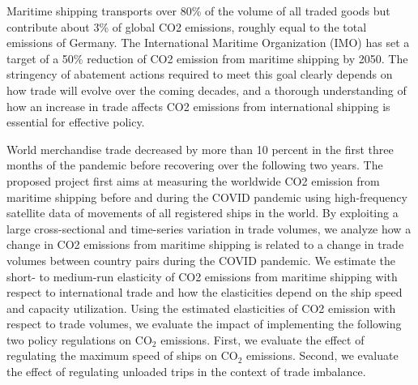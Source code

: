 \documentclass[hidelinks, 12pt,letterpaper]{article}
\begin{document}

 
 
Maritime shipping transports over 80\% of the volume of all traded goods but contribute about 3\% of global CO2 emissions, roughly equal to the total emissions of Germany.  The International Maritime Organization (IMO) has set a target of a 50\% reduction of CO2 emission from maritime shipping by 2050. The stringency of abatement actions required to meet this goal clearly depends on how trade will evolve over the coming decades, and a thorough understanding of how an increase in trade affects CO2 emissions from international shipping is essential for effective policy.  


World merchandise trade decreased by more than 10 percent in the first three months of the pandemic before recovering over the following two years.  The proposed project first aims at measuring the worldwide CO2 emission from maritime shipping before and during the COVID pandemic using high-frequency satellite data of movements of all registered ships in the world. By exploiting a large cross-sectional and time-series variation in trade volumes, we analyze how a change in CO2 emissions from maritime shipping is related to a change in trade volumes between country pairs during the COVID pandemic. We estimate the short- to medium-run elasticity of CO2 emissions from maritime shipping with respect to international trade and how the elasticities depend on the ship speed and capacity utilization. Using the estimated elasticities of CO2 emission with respect to trade volumes, we evaluate the impact of implementing  the following two policy regulations on CO$_2$ emissions. First, we evaluate the effect of regulating the maximum speed of ships on CO$_2$ emissions. Second, we evaluate the effect of regulating unloaded trips in the context of trade imbalance. 
 
 

 
\end{document}
